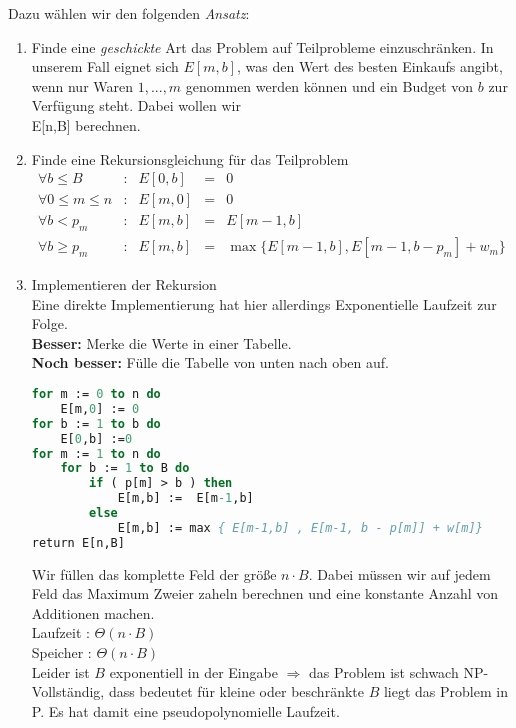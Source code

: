 Dazu wählen wir den folgenden \emph{Ansatz}:
\begin{enumerate}[\bfseries (1)]

\item Finde eine \emph{geschickte} Art das Problem auf Teilprobleme einzuschränken. In unserem Fall eignet sich
$E[m,b]$, was den Wert des besten Einkaufs angibt, wenn nur Waren $1,...,m$ genommen werden können und ein Budget von $b$ zur Verfügung steht. Dabei wollen wir\\
E[n,B] berechnen.

\item Finde eine Rekursionsgleichung für das Teilproblem
$$
\begin{array}{lcrcl}
\forall b \leq B &:& E[0,b] &=& 0\\
\forall 0 \leq m \leq n &:& E[m,0] &=& 0\\
\forall b < p_m &:& E[m,b] &=& E[m-1,b]\\
\forall b \geq p_m &:& E[m,b] &=& \max \{ E[m-1,b] , E[m-1, b-p_m] + w_m\}
\end{array}
$$

\item Implementieren der Rekursion\\
Eine direkte Implementierung hat hier allerdings Exponentielle Laufzeit zur Folge.\\
\textbf{Besser:} Merke die Werte in einer Tabelle.\\
\textbf{Noch besser:} Fülle die Tabelle von unten nach oben auf.

\pagebreak

\begin{lstlisting}[language=Pascal]
for m := 0 to n do
	E[m,0] := 0
for b := 1 to b do
	E[0,b] :=0
for m := 1 to n do
	for b := 1 to B do
		if ( p[m] > b ) then
			E[m,b] :=  E[m-1,b]
		else
			E[m,b] := max { E[m-1,b] , E[m-1, b - p[m]] + w[m]}
return E[n,B]
\end{lstlisting}

Wir füllen das komplette Feld der größe $n \cdot B$. Dabei müssen wir auf jedem Feld das Maximum Zweier zaheln berechnen und eine konstante Anzahl von Additionen machen.\\
Laufzeit : $\Theta ( n \cdot B)$\\
Speicher : $\Theta ( n \cdot B)$\\

Leider ist $B$ exponentiell in der Eingabe $\Rightarrow$ das Problem ist schwach NP-Vollständig, dass bedeutet für kleine oder beschränkte $B$ liegt das Problem in P. Es hat damit eine pseudopolynomielle Laufzeit.


\end{enumerate}
